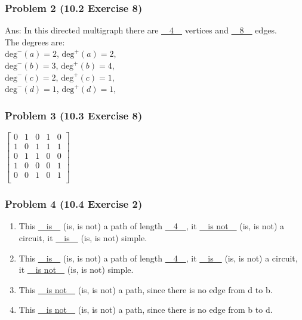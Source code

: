 \documentclass[12pt,hyperref={bookmarks=false}]{beamer}
\begin{document}
	\begin{frame}
	\frametitle{Problem 2 (10.2 Exercise 8)}
	\fontsize{12}{16pt}\selectfont
	
	Ans: In this directed multigraph there are \underline{~~4~~} vertices and \underline{~~8~~} edges.\\ The degrees are:\\ 
	$\text{deg}^{-}(a) = 2$, $\text{deg}^{+}(a) = 2$, \\
	$\text{deg}^{-}(b) = 3$, $\text{deg}^{+}(b) = 4$, \\
	$\text{deg}^{-}(c) = 2$, $\text{deg}^{+}(c) = 1$, \\
	$\text{deg}^{-}(d) = 1$, $\text{deg}^{+}(d) = 1$, \\	
	\end{frame}
	

	\begin{frame}
	\frametitle{Problem 3 (10.3 Exercise 8)}
	\fontsize{12}{16pt}\selectfont

	$
	\begin{bmatrix}
	   0 & 1 & 0 & 1 & 0 \\
 	   1 & 0 & 1 & 1 & 1 \\
 	   0 & 1 & 1 & 0 & 0 \\
 	   1 & 0 & 0 & 0 & 1 \\
 	   0 & 0 & 1 & 0 & 1 \\
	\end{bmatrix}
	$

	\end{frame}

	\begin{frame}
	\frametitle{Problem 4 (10.4 Exercise 2)}
	\fontsize{10}{10pt}\selectfont
	\begin{enumerate}[label=(\alph*)]
	\setlength\itemsep{1em}
	\item This \underline{~~is~~} (is, is not) a path of length \underline{~~4~~}, it \underline{~~is not~~} (is, is not) a circuit, it \underline{~~is~~} (is, is not) simple.

	\item This \underline{~~is~~} (is, is not) a path of length \underline{~~4~~}, it \underline{~~is~~} (is, is not) a circuit, it \underline{~~is not~~} (is, is not) simple.

	\item This \underline{~~is not~~} (is, is not) a path, since there is no edge from d to b.
	
	\item This \underline{~~is not~~} (is, is not) a path, since there is no edge from b to d.
	\end{enumerate}
	\end{frame}
	
\end{document}
